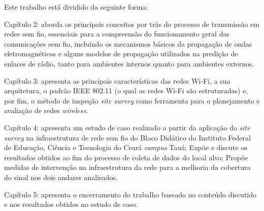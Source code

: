 Este trabalho está dividido da seguinte forma:

\begin{compactitem}
	\item Capítulo 2: aborda os principais conceitos por trás do processo de transmissão em redes sem fio, essenciais para a compreensão do funcionamento geral das comunicações sem fio, incluindo os mecanismos básicos da propagação de ondas eletromagnéticas e alguns modelos de propagação utilizados na predição de enlaces de rádio, tanto para ambientes internos quanto para ambientes externos.
	
	\item Capítulo 3: apresenta as principais características das redes Wi-Fi, a sua arquitetura, o padrão IEEE 802.11 (o qual as redes Wi-Fi são estruturadas) e, por fim, o método de inspeção \textit{site survey} como ferramenta para o planejamento e avaliação de redes \textit{wireless}.
	
	\item Capítulo 4: apresenta um estudo de caso realizado a partir da aplicação do \textit{site survey} na infraestrutura de rede sem fio do Bloco Didático do Instituto Federal de Educação, Ciência e Tecnologia do Ceará \textit{campus} Tauá; Expõe e discute os resultados obtidos ao fim do processo de coleta de dados do local alvo; Propõe medidas de intervenção na infraestrutura da rede para a melhoria da cobertura do sinal nos dois andares analisados.
	
	\item Capítulo 5: apresenta o encerramento do trabalho baseado no conteúdo discutido e nos resultados obtidos no estudo de caso.
\end{compactitem}